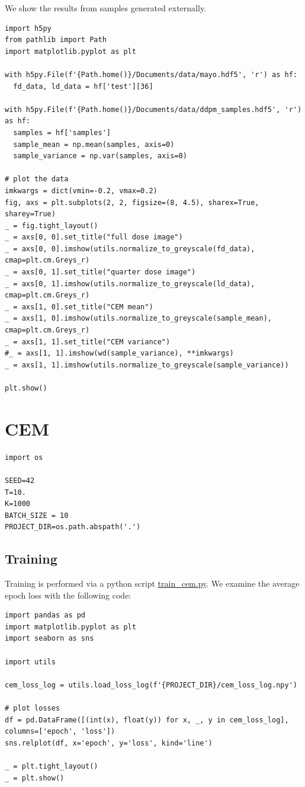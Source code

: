 \documentclass[a4paper, 11pt]{article}
\begin{document}
We show the results from samples generated externally.
\begin{verbatim}
import h5py
from pathlib import Path
import matplotlib.pyplot as plt

with h5py.File(f'{Path.home()}/Documents/data/mayo.hdf5', 'r') as hf:
  fd_data, ld_data = hf['test'][36]

with h5py.File(f'{Path.home()}/Documents/data/ddpm_samples.hdf5', 'r') as hf:
  samples = hf['samples']
  sample_mean = np.mean(samples, axis=0)
  sample_variance = np.var(samples, axis=0)

# plot the data
imkwargs = dict(vmin=-0.2, vmax=0.2)
fig, axs = plt.subplots(2, 2, figsize=(8, 4.5), sharex=True, sharey=True)
_ = fig.tight_layout()
_ = axs[0, 0].set_title("full dose image")
_ = axs[0, 0].imshow(utils.normalize_to_greyscale(fd_data), cmap=plt.cm.Greys_r)
_ = axs[0, 1].set_title("quarter dose image")
_ = axs[0, 1].imshow(utils.normalize_to_greyscale(ld_data), cmap=plt.cm.Greys_r)
_ = axs[1, 0].set_title("CEM mean")
_ = axs[1, 0].imshow(utils.normalize_to_greyscale(sample_mean), cmap=plt.cm.Greys_r)
_ = axs[1, 1].set_title("CEM variance")
#_ = axs[1, 1].imshow(wd(sample_variance), **imkwargs)
_ = axs[1, 1].imshow(utils.normalize_to_greyscale(sample_variance))

plt.show()
\end{verbatim}

\section{CEM}
\label{sec:org3ff1db7}
\begin{verbatim}
import os

SEED=42
T=10.
K=1000
BATCH_SIZE = 10
PROJECT_DIR=os.path.abspath('.')
\end{verbatim}
\subsection{Training}
\label{sec:org248b1ae}
Training is performed via a python script \url{train\_cem.py}. We examine the average epoch loss with the following code:
\begin{verbatim}
import pandas as pd
import matplotlib.pyplot as plt
import seaborn as sns

import utils

cem_loss_log = utils.load_loss_log(f'{PROJECT_DIR}/cem_loss_log.npy')

# plot losses
df = pd.DataFrame([(int(x), float(y)) for x, _, y in cem_loss_log], columns=['epoch', 'loss'])
sns.relplot(df, x='epoch', y='loss', kind='line')

_ = plt.tight_layout()
_ = plt.show()
\end{verbatim}
\end{document}
